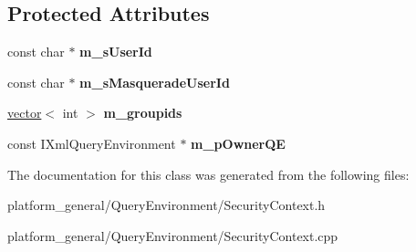 \subsection*{\-Protected \-Attributes}
\begin{DoxyCompactItemize}
\item 
\hypertarget{classgeneral__server_1_1SecurityContext_a9b2a15d8e397ce47df906a474d75b4a9}{const char $\ast$ {\bfseries m\-\_\-s\-User\-Id}}\label{classgeneral__server_1_1SecurityContext_a9b2a15d8e397ce47df906a474d75b4a9}

\item 
\hypertarget{classgeneral__server_1_1SecurityContext_ae95bd3695d44ea7d51a342a526f57699}{const char $\ast$ {\bfseries m\-\_\-s\-Masquerade\-User\-Id}}\label{classgeneral__server_1_1SecurityContext_ae95bd3695d44ea7d51a342a526f57699}

\item 
\hypertarget{classgeneral__server_1_1SecurityContext_a7d474527a7aa4926c108037f69bf606f}{\hyperlink{classvector}{vector}$<$ int $>$ {\bfseries m\-\_\-groupids}}\label{classgeneral__server_1_1SecurityContext_a7d474527a7aa4926c108037f69bf606f}

\item 
\hypertarget{classgeneral__server_1_1SecurityContext_a792ee55d8dd81c271698f7e5b947a08e}{const \-I\-Xml\-Query\-Environment $\ast$ {\bfseries m\-\_\-p\-Owner\-Q\-E}}\label{classgeneral__server_1_1SecurityContext_a792ee55d8dd81c271698f7e5b947a08e}

\end{DoxyCompactItemize}


\-The documentation for this class was generated from the following files\-:\begin{DoxyCompactItemize}
\item 
platform\-\_\-general/\-Query\-Environment/\-Security\-Context.\-h\item 
platform\-\_\-general/\-Query\-Environment/\-Security\-Context.\-cpp\end{DoxyCompactItemize}
